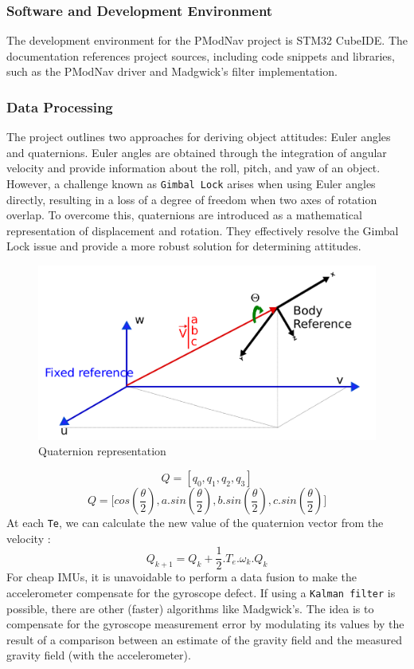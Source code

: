 \subsubsection{Software and Development Environment}
The development environment for the PModNav project is STM32 CubeIDE. The documentation references project sources, including code snippets and libraries, such as the PModNav driver and Madgwick's filter implementation. 

\subsubsection{Data Processing}
The project outlines two approaches for deriving object attitudes: Euler angles and quaternions. Euler angles are obtained through the integration of angular velocity and provide information about the roll, pitch, and yaw of an object. However, a challenge known as \texttt{Gimbal Lock}\cite{gimbal_lock} arises when using Euler angles directly, resulting in a loss of a degree of freedom when two axes of rotation overlap. To overcome this, quaternions are introduced as a mathematical representation of displacement and rotation. They effectively resolve the Gimbal Lock issue and provide a more robust solution for determining attitudes.
\begin{figure}[H]
    \centering
    \includegraphics[width=0.65\linewidth]{./projects/pmodnav/quaternions.png}
    \caption{Quaternion representation}
\end{figure}
$$ Q = [q_0, q_1, q_2, q_3 ] $$
$$ Q = \big[cos(\frac{\theta}{2}), a.sin(\frac{\theta}{2}), b.sin(\frac{\theta}{2}), c.sin(\frac{\theta}{2})\big] $$
At each \texttt{Te}, we can calculate the new value of the quaternion vector from the velocity :
$$ Q_{k+1} = Q_k+\frac{1}{2}.T_e.\omega_k.Q_k $$
For cheap IMUs, it is unavoidable to perform a data fusion to make the accelerometer compensate for the gyroscope defect. If using a \texttt{Kalman filter}\cite{kalman_filter} is possible, there are other (faster) algorithms like Madgwick's. The idea is to compensate for the gyroscope measurement error by modulating its values by the result of a comparison between an estimate of the gravity field and the measured gravity field (with the accelerometer).
\hfill \break
{}

